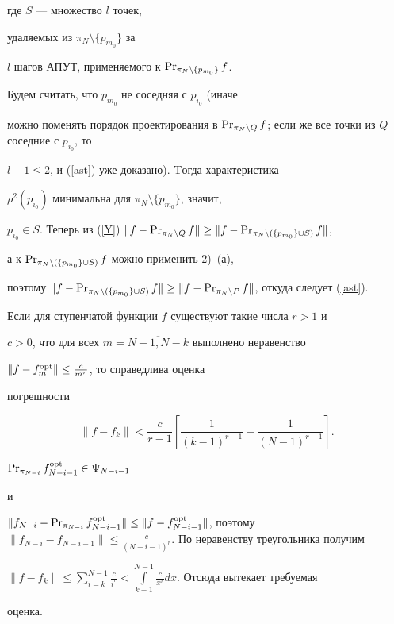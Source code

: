 \begin{pf}
где $S$ --- множество $l$ точек,


удаляемых из $\pi_N\setminus\{p_{m_0}\}$ за


$l$ шагов АПУТ, применяемого к $\operatorname{Pr}_{\pi_N\setminus\{p_{m_0}\}}f$.


Будем считать, что $p_{m_0}$ не соседняя с $p_{i_0}$ (иначе


можно поменять порядок проектирования в $\PR_{\pi_N\setminus


Q}f$; если же все точки из $Q$ соседние с $p_{i_0}$, то


$l+1\leq 2$, и (\ref{ast}) уже доказано). Tогда характеристика


$\rho^2(p_{i_0})$ минимальна для $\pi_N\setminus\{p_{m_0}\}$, значит,


$p_{i_0}\in S$. Теперь из (\ref{Y}) $\|f-\PR_{\pi_N\setminus Q}f


\|\geq \|f-\PR_{\pi_N\setminus (\{p_{m_0}\}\cup S)}f\|$,


а к $\operatorname{Pr}_{\pi_N\setminus (\{p_{m_0}\}\cup S)}f$ можно применить 2)~(а),


поэтому $\|f-\PR_{\pi_N\setminus (\{p_{m_0}\}\cup S)}f\|\geq


\|f-\PR_{\pi_N\setminus P}f\|$, откуда следует (\ref{ast}).


\end{pf}





\begin{lem}


Если для ступенчатой функции $f$ существуют такие числа $r>1$ и


$c>0$, что для всех $m=\overline{N-1,N-k}$ выполнено неравенство


$\|f-f_m^{\operatorname{opt}}\|\leq\frac{c}{m^r}$, то справедлива оценка


погрешности


$$


\|f-f_k\|<\frac{c}{r-1}\left[\frac{1}{(k-1)^{r-1}}-


\frac{1}{(N-1)^{r-1}}\right].


$$


\end{lem}





\begin{pf}


$\operatorname{Pr}_{\pi_{N-i}}f_{N-i-1}^{\operatorname{opt}} \in \Psi_{N-i-1}$


и


$\|f_{N-i}-\PR_{\pi_{N-i}}f_{N-i-1}^{\opt}\|\leq


\|f-f_{N-i-1}^{\opt}\|$, поэтому $\|f_{N-i}-f_{N-i-1}\|\leq \frac


{c}{(N-i-1)^r}$. По неравенству треугольника получим


$\|f-f_k\|\leq\sum\limits_{i=k}^{N-1}\frac{c}{i^r}


<\int\limits_{k-1}^{N-1}\frac{c}{x^r} dx$. Отсюда вытекает требуемая


оценка.


\end{pf}





